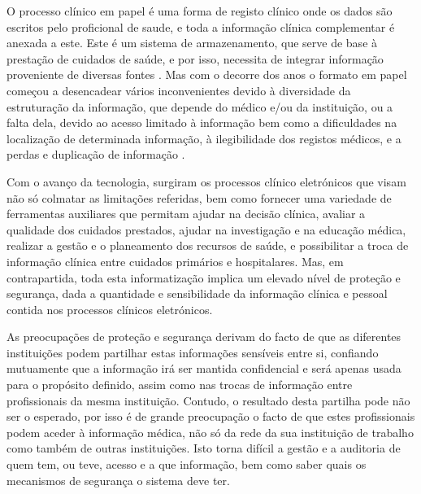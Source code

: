 \documentclass[conference]{IEEEtran}
\begin{document}
O processo clínico em papel é uma forma de registo clínico onde os dados são escritos pelo proficional de saude, e toda a informação clínica complementar é anexada a este. Este é um sistema de armazenamento, que serve de base à prestação de cuidados de saúde, e por isso, necessita de integrar informação proveniente de diversas fontes \cite{regclinelect}. Mas com o decorre dos anos o formato em papel começou a desencadear vários inconvenientes devido à diversidade da estruturação da informação, que depende do médico e/ou da instituição, ou a falta dela, devido ao acesso limitado à informação bem como a dificuldades na localização de determinada informação, à ilegibilidade dos registos médicos, e a perdas e duplicação de informação \cite{regclinelect}.

Com o avanço da tecnologia, surgiram os processos clínico eletrónicos que visam não só colmatar as limitações referidas, bem como fornecer uma variedade de ferramentas auxiliares que permitam ajudar na decisão clínica, avaliar a qualidade dos cuidados prestados, ajudar na investigação e na educação médica, realizar a gestão e o planeamento dos recursos de saúde, e possibilitar a troca de informação clínica entre cuidados primários e hospitalares. Mas, em contrapartida, toda esta informatização implica um elevado nível de proteção e segurança, dada a quantidade e sensibilidade da informação clínica e pessoal contida nos processos clínicos eletrónicos.

As preocupações de proteção e segurança derivam do facto de que as diferentes instituições podem partilhar estas informações sensíveis entre si, confiando mutuamente que a informação irá ser mantida confidencial e será apenas usada para o propósito definido, assim como nas trocas de informação entre profissionais da mesma instituição. Contudo, o resultado desta partilha pode não ser o esperado, por isso é de grande preocupação o facto de que estes profissionais podem aceder à informação médica, não só da rede da sua instituição de trabalho como também de outras instituições. Isto torna difícil a gestão e a auditoria de quem tem, ou teve, acesso e a que informação, bem como saber quais os mecanismos de segurança o sistema deve ter.
\end{document}
